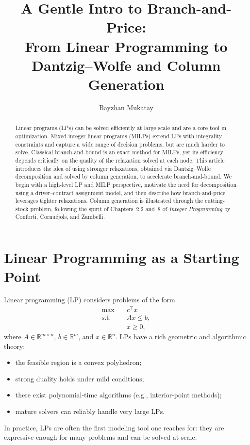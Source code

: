 \documentclass[11pt]{article}
\title{A Gentle Intro to Branch-and-Price:\\
From Linear Programming to Dantzig--Wolfe and Column Generation}
\author{Bayzhan Mukatay}
\date{}
\begin{document}
\maketitle

\begin{abstract}
Linear programs (LPs) can be solved efficiently at large scale and are a core tool
in optimization.
Mixed-integer linear programs (MILPs) extend LPs with integrality constraints and
capture a wide range of decision problems, but are much harder to solve.
Classical branch-and-bound is an exact method for MILPs, yet its efficiency
depends critically on the quality of the relaxation solved at each node.
This article introduces the idea of using stronger relaxations, obtained via
Dantzig--Wolfe decomposition and solved by column generation, to accelerate
branch-and-bound.
We begin with a high-level LP and MILP perspective, motivate the need for
decomposition using a driver--contract assignment model, and then describe how
branch-and-price leverages tighter relaxations.
Column generation is illustrated through the cutting-stock problem, following
the spirit of Chapters~2.2 and~8 of \emph{Integer Programming} by
Conforti, Cornu\'ejols, and Zambelli.
\end{abstract}

\section{Linear Programming as a Starting Point}

Linear programming (LP) considers problems of the form
\begin{align*}
    \max \quad & c^\top x \\
    \text{s.t.} \quad & Ax \le b, \\
    & x \ge 0,
\end{align*}
where $A \in \mathbb{R}^{m \times n}$, $b \in \mathbb{R}^m$, and
$x \in \mathbb{R}^n$.
LPs have a rich geometric and algorithmic theory:
\begin{itemize}
    \item the feasible region is a convex polyhedron;
    \item strong duality holds under mild conditions;
    \item there exist polynomial-time algorithms (e.g., interior-point methods);
    \item mature solvers can reliably handle very large LPs.
\end{itemize}
In practice, LPs are often the first modeling tool one reaches for: they are
expressive enough for many problems and can be solved at scale.
\end{document}
